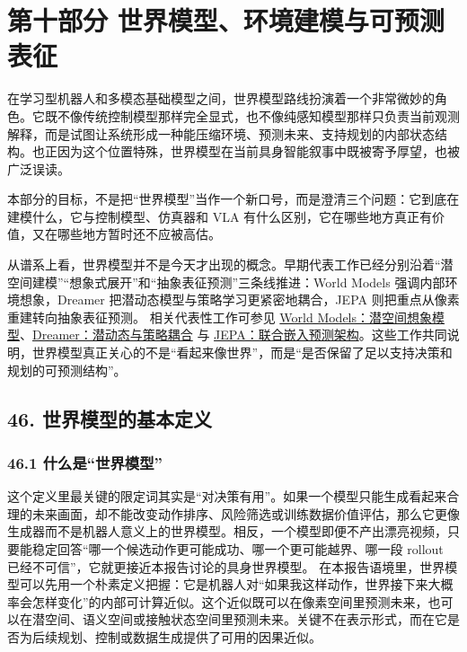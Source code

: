 
\part*{第十部分 世界模型、环境建模与可预测表征}

在学习型机器人和多模态基础模型之间，世界模型路线扮演着一个非常微妙的角色。它既不像传统控制模型那样完全显式，也不像纯感知模型那样只负责当前观测解释，而是试图让系统形成一种能压缩环境、预测未来、支持规划的内部状态结构。也正因为这个位置特殊，世界模型在当前具身智能叙事中既被寄予厚望，也被广泛误读。

本部分的目标，不是把“世界模型”当作一个新口号，而是澄清三个问题：它到底在建模什么，它与控制模型、仿真器和 VLA 有什么区别，它在哪些地方真正有价值，又在哪些地方暂时还不应被高估。

从谱系上看，世界模型并不是今天才出现的概念。早期代表工作已经分别沿着“潜空间建模”“想象式展开”和“抽象表征预测”三条线推进：World Models 强调内部环境想象，Dreamer 把潜动态模型与策略学习更紧密地耦合，JEPA 则把重点从像素重建转向抽象表征预测。 相关代表性工作可参见 \href{https://arxiv.org/abs/1803.10122}{World Models：潜空间想象模型}、\href{https://arxiv.org/abs/1912.01603}{Dreamer：潜动态与策略耦合} 与 \href{https://arxiv.org/abs/2301.08243}{JEPA：联合嵌入预测架构}。这些工作共同说明，世界模型真正关心的不是“看起来像世界”，而是“是否保留了足以支持决策和规划的可预测结构”。

\chapter*{46. 世界模型的基本定义}

\section*{46.1 什么是“世界模型”}


这个定义里最关键的限定词其实是“对决策有用”。如果一个模型只能生成看起来合理的未来画面，却不能改变动作排序、风险筛选或训练数据价值评估，那么它更像生成器而不是机器人意义上的世界模型。相反，一个模型即便不产出漂亮视频，只要能稳定回答“哪一个候选动作更可能成功、哪一个更可能越界、哪一段 rollout 已经不可信”，它就更接近本报告讨论的具身世界模型。 在本报告语境里，世界模型可以先用一个朴素定义把握：它是机器人对“如果我这样动作，世界接下来大概率会怎样变化”的内部可计算近似。这个近似既可以在像素空间里预测未来，也可以在潜空间、语义空间或接触状态空间里预测未来。关键不在表示形式，而在它是否为后续规划、控制或数据生成提供了可用的因果近似。


